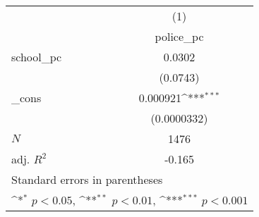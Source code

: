 {
\def\sym#1{\ifmmode^{#1}\else\(^{#1}\)\fi}
\begin{tabular}{l*{1}{c}}
\hline\hline
            &\multicolumn{1}{c}{(1)}\\
            &\multicolumn{1}{c}{police\_pc}\\
\hline
school\_pc   &      0.0302         \\
            &    (0.0743)         \\
[1em]
\_cons      &    0.000921\sym{***}\\
            & (0.0000332)         \\
\hline
\(N\)       &        1476         \\
adj. \(R^{2}\)&      -0.165         \\
\hline\hline
\multicolumn{2}{l}{\footnotesize Standard errors in parentheses}\\
\multicolumn{2}{l}{\footnotesize \sym{*} \(p<0.05\), \sym{**} \(p<0.01\), \sym{***} \(p<0.001\)}\\
\end{tabular}
}
